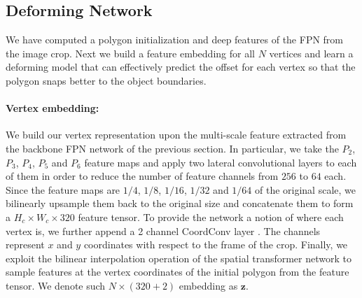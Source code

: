 \documentclass[10pt,twocolumn,letterpaper]{article}
\begin{document}
\subsection{Deforming Network}
We have   computed a polygon initialization and deep features of the FPN from the image crop. Next  we build a feature embedding for all $N$ vertices and learn a deforming model that can effectively predict the offset for each vertex so that the polygon snaps better to the object boundaries.



\paragraph{Vertex embedding:}
We build our vertex representation upon the multi-scale feature extracted from the backbone FPN network of the previous section. In particular, we take the $P_2$, $P_3$, $P_4$, $P_5$ and $P_6$ feature maps and apply two lateral convolutional layers to each of them in order to reduce the number of feature channels from $256$ to $64$ each. Since the feature maps are $1/4$, $1/8$, $1/16$, $1/32$ and $1/64$ of the original scale, we bilinearly upsample them back to the original size and concatenate them to form a $H_c \times W_c \times 320$ feature tensor. 
To provide the network a notion of where each vertex is, we further append a 2 channel CoordConv layer \cite{coordconv}. The channels represent $x$ and $y$ coordinates with respect to the frame of the crop. Finally, we exploit the bilinear interpolation operation of the spatial transformer network \cite{jaderberg2015spatial} to sample features at the vertex coordinates of the initial polygon from  the feature tensor. 
We denote such $N \times (320+2)$ embedding as $\pmb{z}$. 



\vspace{-1mm}
\end{document}
